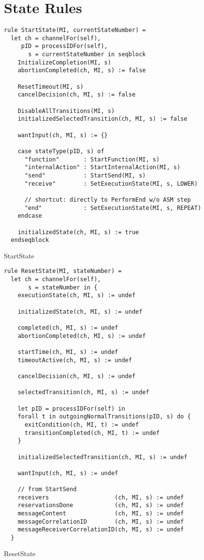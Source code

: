 \section{State Rules}

\begin{listing}[H]
\begin{verbatim}
rule StartState(MI, currentStateNumber) =
  let ch = channelFor(self),
     pID = processIDFor(self),
       s = currentStateNumber in seqblock
    InitializeCompletion(MI, s)
    abortionCompleted(ch, MI, s) := false

    ResetTimeout(MI, s)
    cancelDecision(ch, MI, s) := false

    DisableAllTransitions(MI, s)
    initializedSelectedTransition(ch, MI, s) := false

    wantInput(ch, MI, s) := {}

    case stateType(pID, s) of
      "function"       : StartFunction(MI, s)
      "internalAction" : StartInternalAction(MI, s)
      "send"           : StartSend(MI, s)
      "receive"        : SetExecutionState(MI, s, LOWER)

      // shortcut: directly to PerformEnd w/o ASM step
      "end"            : SetExecutionState(MI, s, REPEAT)
    endcase

    initializedState(ch, MI, s) := true
  endseqblock
\end{verbatim}
\caption{StartState}
\label{lst:asm:StartState}
\end{listing}




\begin{listing}[H]
\begin{verbatim}
rule ResetState(MI, stateNumber) =
  let ch = channelFor(self),
       s = stateNumber in {
    executionState(ch, MI, s) := undef

    initializedState(ch, MI, s) := undef

    completed(ch, MI, s) := undef
    abortionCompleted(ch, MI, s) := undef

    startTime(ch, MI, s) := undef
    timeoutActive(ch, MI, s) := undef

    cancelDecision(ch, MI, s) := undef

    selectedTransition(ch, MI, s) := undef

    let pID = processIDFor(self) in
    forall t in outgoingNormalTransitions(pID, s) do {
      exitCondition(ch, MI, t) := undef
      transitionCompleted(ch, MI, t) := undef
    }

    initializedSelectedTransition(ch, MI, s) := undef

    wantInput(ch, MI, s) := undef

    // from StartSend
    receivers                   (ch, MI, s) := undef
    reservationsDone            (ch, MI, s) := undef
    messageContent              (ch, MI, s) := undef
    messageCorrelationID        (ch, MI, s) := undef
    messageReceiverCorrelationID(ch, MI, s) := undef
  }
\end{verbatim}
\caption{ResetState}
\label{lst:asm:ResetState}
\end{listing}




